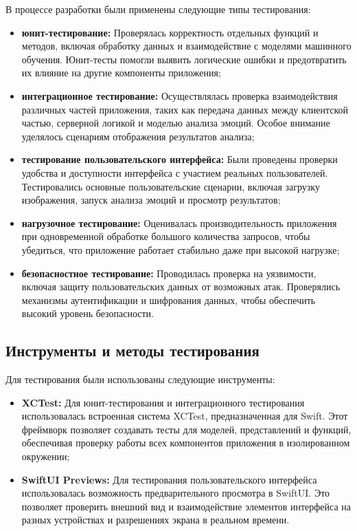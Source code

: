 {В процессе разработки были применены следующие типы тестирования:

\begin{itemize}
    \item \textbf{юнит-тестирование:} Проверялась корректность отдельных функций и методов, включая обработку данных и взаимодействие с моделями машинного обучения. Юнит-тесты помогли выявить логические ошибки и предотвратить их влияние на другие компоненты приложения;
    \item \textbf{интеграционное тестирование:} Осуществлялась проверка взаимодействия различных частей приложения, таких как передача данных между клиентской частью, серверной логикой и моделью анализа эмоций. Особое внимание уделялось сценариям отображения результатов анализа;
    \item \textbf{тестирование пользовательского интерфейса:} Были проведены проверки удобства и доступности интерфейса с участием реальных пользователей. Тестировались основные пользовательские сценарии, включая загрузку изображения, запуск анализа эмоций и просмотр результатов;
    \item \textbf{нагрузочное тестирование:} Оценивалась производительность приложения при одновременной обработке большого количества запросов, чтобы убедиться, что приложение работает стабильно даже при высокой нагрузке;
    \item \textbf{безопасностное тестирование:} Проводилась проверка на уязвимости, включая защиту пользовательских данных от возможных атак. Проверялись механизмы аутентификации и шифрования данных, чтобы обеспечить высокий уровень безопасности.
\end{itemize}

\subsection{Инструменты и методы тестирования}

Для тестирования были использованы следующие инструменты:

\begin{itemize}
    \item \textbf{XCTest:} Для юнит-тестирования и интеграционного тестирования использовалась встроенная система XCTest, предназначенная для Swift. Этот фреймворк позволяет создавать тесты для моделей, представлений и функций, обеспечивая проверку работы всех компонентов приложения в изолированном окружении;
    \item \textbf{SwiftUI Previews:} Для тестирования пользовательского интерфейса использовалась возможность предварительного просмотра в SwiftUI. Это позволяет проверить внешний вид и взаимодействие элементов интерфейса на разных устройствах и разрешениях экрана в реальном времени.
\end{itemize}

}
